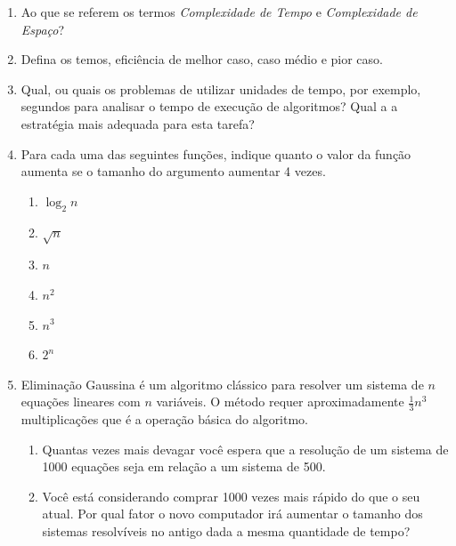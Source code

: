 \documentclass{article}
\begin{document}
\begin{enumerate}
    

    \item Ao que se referem os termos \textit{Complexidade de Tempo} e \textit{Complexidade de Espaço}?
    
    \item Defina os temos, eficiência de melhor caso, caso médio e pior caso.
    
    \item Qual, ou quais os problemas de utilizar unidades de tempo, por exemplo, segundos para analisar o tempo de execução de algoritmos? Qual a a estratégia mais adequada para esta tarefa?
    
    \item Para cada uma das seguintes funções, indique quanto o valor da função aumenta se o tamanho do argumento aumentar 4 vezes.%

    
    \begin{enumerate}
        \item $\log_2n$
        \item $\sqrt{n}$
        \item $n$
        \item $n^2$
        \item $n^3$
        \item $2^n$
    \end{enumerate}
    
    \item Eliminação Gaussina é um algoritmo clássico para resolver um sistema de $n$ equações lineares com $n$ variáveis. O método requer aproximadamente $\frac{1}{3}n^3$ multiplicações que é a operação básica do algoritmo.
    \begin{enumerate}
        \item Quantas vezes mais devagar você espera que a resolução de um sistema de 1000 equações seja em relação a um sistema de 500.
        \item Você está considerando comprar 1000 vezes mais rápido do que o seu atual. Por qual fator o novo computador irá aumentar o tamanho dos sistemas resolvíveis no antigo dada a mesma quantidade de tempo? 
    \end{enumerate}
    

\end{enumerate}
\end{document}
